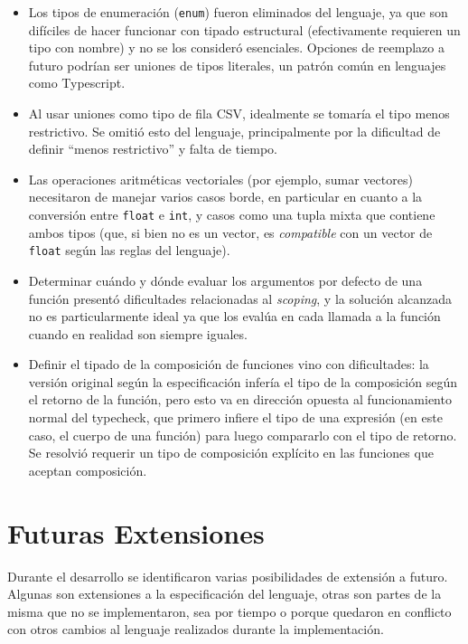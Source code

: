 \begin{itemize}
	\item Los tipos de enumeración (\texttt{enum}) fueron eliminados del lenguaje, ya que son difíciles de hacer funcionar con tipado estructural (efectivamente requieren un tipo con nombre) y no se los consideró esenciales. Opciones de reemplazo a futuro podrían ser uniones de tipos literales, un patrón común en lenguajes como Typescript.
	\item Al usar uniones como tipo de fila CSV, idealmente se tomaría el tipo menos restrictivo. Se omitió esto del lenguaje, principalmente por la dificultad de definir ``menos restrictivo'' y falta de tiempo.
	\item Las operaciones aritméticas vectoriales (por ejemplo, sumar vectores) necesitaron de manejar varios casos borde, en particular en cuanto a la conversión entre \texttt{float} e \texttt{int}, y casos como una tupla mixta que contiene ambos tipos (que, si bien no es un vector, es \textit{compatible} con un vector de \texttt{float} según las reglas del lenguaje).
	\item Determinar cuándo y dónde evaluar los argumentos por defecto de una función presentó dificultades relacionadas al \textit{scoping}, y la solución alcanzada no es particularmente ideal ya que los evalúa en cada llamada a la función cuando en realidad son siempre iguales.
	\item Definir el tipado de la composición de funciones vino con dificultades: la versión original según la especificación infería el tipo de la composición según el retorno de la función, pero esto va en dirección opuesta al funcionamiento normal del typecheck, que primero infiere el tipo de una expresión (en este caso, el cuerpo de una función) para luego compararlo con el tipo de retorno. Se resolvió requerir un tipo de composición explícito en las funciones que aceptan composición.
\end{itemize}

\section{Futuras Extensiones}\label{sec:future}

Durante el desarrollo se identificaron varias posibilidades de extensión a futuro. Algunas son extensiones a la especificación del lenguaje, otras son partes de la misma que no se implementaron, sea por tiempo o porque quedaron en conflicto con otros cambios al lenguaje realizados durante la implementación.


